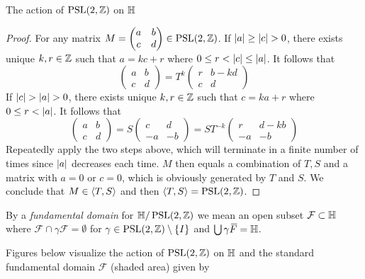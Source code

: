 \begin{hyperbolicbox}{The action of $\operatorname{PSL}(2,\mathbb{Z})$ on $\mathbb{H}$}
\begin{proof}
            For any matrix $M=\begin{pmatrix}
                a&b\\c&d
            \end{pmatrix}\in\operatorname{PSL}(2,\mathbb{Z})$. If $\left\lvert a\right\rvert\geq\left\lvert c\right\rvert>0$, there exists unique $k,r\in\mathbb{Z}$ such that $a=kc+r$ where $0\leq r<\left\lvert c\right\rvert\leq\left\lvert a\right\rvert$. It follows that 
            $$
            \begin{pmatrix}
                a&b\\c&d
            \end{pmatrix}=
            T^k\begin{pmatrix}
                r&b-kd\\c&d
            \end{pmatrix}
            $$
            If $\left\lvert c\right\rvert>\left\lvert a\right\rvert>0$, there exists unique $k,r\in\mathbb{Z}$ such that $c=ka+r$ where $0\leq r<\left\lvert a\right\rvert$. It follows that
            $$
            \begin{pmatrix}
                a&b\\c&d
            \end{pmatrix}=
            S\begin{pmatrix}
                c&d\\-a&-b
            \end{pmatrix}=
            ST^{-k}\begin{pmatrix}
                r&d-kb\\-a&-b
            \end{pmatrix}
            $$
            Repeatedly apply the two steps above, which will terminate in a finite number of times since $\left\lvert a\right\rvert$ decreases each time. $M$ then equals a combination of $T,S$ and a matrix with $a=0$ or $c=0$, which is obviously generated by $T$ and $S$. We conclude that $M\in\langle T,S\rangle$ and then $\langle T,S\rangle=\operatorname{PSL}(2,\mathbb{Z})$.
        \end{proof}

        \begin{defi}
            By a \textit{fundamental domain} for $\mathbb{H}/\operatorname{PSL}(2,\mathbb{Z})$ we mean an open subset $\mathcal{F}\subset\mathbb{H}$ where $\mathcal{F}\cap\gamma\mathcal{F}=\emptyset$ for $\gamma\in\operatorname{PSL}(2,\mathbb{Z})\setminus\left\{I\right\}$ and $\bigcup\gamma{}\mkern3mu\overline{\mkern-3muF}=\mathbb{H}$.\cite{milneMF}
        \end{defi}
        \vspace{-1em}
        
        Figures below visualize the action of $\operatorname{PSL}(2,\mathbb{Z})$ on $\mathbb{H}$ and the standard fundamental domain $\mathcal{F}$ (shaded area) given by


\end{hyperbolicbox}
